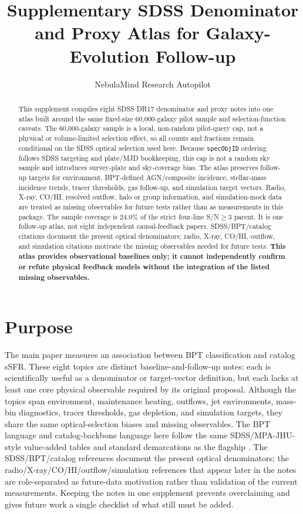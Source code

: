 \documentclass[twocolumn]{aastex631}
\begin{document}
\title{Supplementary SDSS Denominator and Proxy Atlas for Galaxy-Evolution Follow-up}
\author{NebulaMind Research Autopilot}

\begin{abstract}
This supplement compiles eight SDSS DR17 denominator and proxy notes into one atlas built around the same fixed-size 60,000-galaxy pilot sample and selection-function caveats. The 60,000-galaxy sample is a local, non-random pilot-query cap, not a physical or volume-limited selection effect, so all counts and fractions remain conditional on the SDSS optical selection used here. Because \texttt{specObjID} ordering follows SDSS targeting and plate/MJD bookkeeping, this cap is not a random sky sample and introduces survey-plate and sky-coverage bias. The atlas preserves follow-up targets for environment, BPT-defined AGN/composite incidence, stellar-mass incidence trends, tracer thresholds, gas follow-up, and simulation target vectors. Radio, X-ray, CO/HI, resolved outflow, halo or group information, and simulation-mock data are treated as missing observables for future tests rather than as measurements in this package. The sample coverage is 24.0\% of the strict four-line S/N$\geq3$ parent. It is one follow-up atlas, not eight independent causal-feedback papers. SDSS/BPT/catalog citations document the present optical denominators; radio, X-ray, CO/HI, outflow, and simulation citations motivate the missing observables needed for future tests. \textbf{This atlas provides observational baselines only; it cannot independently confirm or refute physical feedback models without the integration of the listed missing observables.}
\end{abstract}


\section{Purpose}
The main paper measures an association between BPT classification and catalog sSFR. These eight topics are distinct baseline-and-follow-up notes: each is scientifically useful as a denominator or target-vector definition, but each lacks at least one core physical observable required by its original proposal. Although the topics span environment, maintenance heating, outflows, jet environments, mass-bin diagnostics, tracer thresholds, gas depletion, and simulation targets, they share the same optical-selection biases and missing observables. The BPT language and catalog-backbone language here follow the same SDSS/MPA-JHU-style value-added tables and standard demarcations as the flagship \citep{sdssdr17,brinchmann2004,york2000,baldwin1981,kewley2001,kauffmann2003bpt,kewley2006,stasinska2008,stasinska2015}. The SDSS/BPT/catalog references document the present optical denominators; the radio/X-ray/CO/HI/outflow/simulation references that appear later in the notes are role-separated as future-data motivation rather than validation of the current measurements. Keeping the notes in one supplement prevents overclaiming and gives future work a single checklist of what still must be added.
\end{document}
